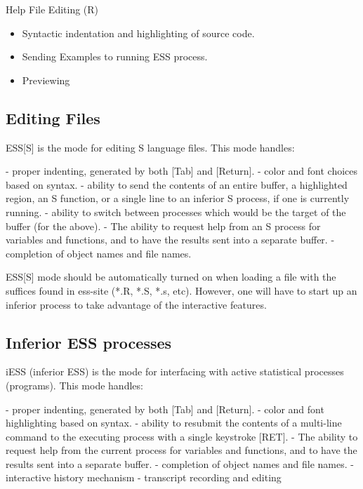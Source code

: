 \documentclass{article}
\begin{document}
Help File Editing (R)
\begin{itemize}
\item Syntactic indentation and highlighting of source code.
\item Sending Examples to running ESS process.
\item Previewing
\end{itemize}



\subsection{Editing Files}
\label{sec:basic:edit}


ESS[S] is the mode for editing S language files.  This mode handles:

- proper indenting, generated by both [Tab] and [Return].
- color and font choices based on syntax.
- ability to send the contents of an entire buffer, a highlighted
  region, an S function, or a single line to an inferior S process, if
  one is currently running.
- ability to switch between processes which would be the target of the 
  buffer (for the above).
- The ability to request help from an S process for variables and
  functions, and to have the results sent into a separate buffer.
- completion of object names and file names.

ESS[S] mode should be automatically turned on when loading a file with
the suffices found in ess-site (*.R, *.S, *.s, etc).  However, one
will have to start up an inferior process to take advantage of the
interactive features.


\subsection{Inferior ESS processes}
\label{sec:basic:inf}

iESS (inferior ESS) is the mode for interfacing with active
statistical processes (programs).  This mode handles:

- proper indenting, generated by both [Tab] and [Return].
- color and font highlighting based on syntax.
- ability to resubmit the contents of a multi-line command
  to the executing process with a single keystroke [RET].
- The ability to request help from the current process for variables
  and functions, and to have the results sent into a separate buffer.
- completion of object names and file names.
- interactive history mechanism
- transcript recording and editing
\end{document}
